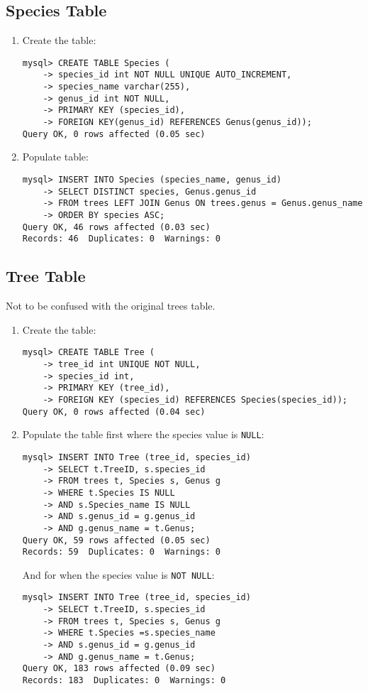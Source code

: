 \documentclass{article}
\begin{document}
\subsection{Species Table}
\begin{enumerate}
    \item Create the table: \begin{verbatim}
mysql> CREATE TABLE Species (
    -> species_id int NOT NULL UNIQUE AUTO_INCREMENT, 
    -> species_name varchar(255),
    -> genus_id int NOT NULL,
    -> PRIMARY KEY (species_id), 
    -> FOREIGN KEY(genus_id) REFERENCES Genus(genus_id)); 
Query OK, 0 rows affected (0.05 sec)
    \end{verbatim}
    \item Populate table: \begin{verbatim}
mysql> INSERT INTO Species (species_name, genus_id) 
    -> SELECT DISTINCT species, Genus.genus_id
    -> FROM trees LEFT JOIN Genus ON trees.genus = Genus.genus_name
    -> ORDER BY species ASC; 
Query OK, 46 rows affected (0.03 sec)
Records: 46  Duplicates: 0  Warnings: 0
    \end{verbatim}
    \end{enumerate}
\subsection{Tree Table}
Not to be confused with the original trees table. \begin{enumerate}
    \item Create the table: \begin{verbatim}
mysql> CREATE TABLE Tree (
    -> tree_id int UNIQUE NOT NULL, 
    -> species_id int,
    -> PRIMARY KEY (tree_id), 
    -> FOREIGN KEY (species_id) REFERENCES Species(species_id)); 
Query OK, 0 rows affected (0.04 sec)
    \end{verbatim}
    \item Populate the table first where the species value is \texttt{NULL}: \begin{verbatim}
mysql> INSERT INTO Tree (tree_id, species_id)
    -> SELECT t.TreeID, s.species_id
    -> FROM trees t, Species s, Genus g
    -> WHERE t.Species IS NULL
    -> AND s.Species_name IS NULL
    -> AND s.genus_id = g.genus_id
    -> AND g.genus_name = t.Genus;
Query OK, 59 rows affected (0.05 sec)
Records: 59  Duplicates: 0  Warnings: 0
    \end{verbatim}
And for when the species value is \texttt{NOT NULL}:\begin{verbatim}
mysql> INSERT INTO Tree (tree_id, species_id)
    -> SELECT t.TreeID, s.species_id
    -> FROM trees t, Species s, Genus g
    -> WHERE t.Species =s.species_name
    -> AND s.genus_id = g.genus_id
    -> AND g.genus_name = t.Genus;
Query OK, 183 rows affected (0.09 sec)
Records: 183  Duplicates: 0  Warnings: 0
\end{verbatim}
\end{enumerate}
\end{document}
